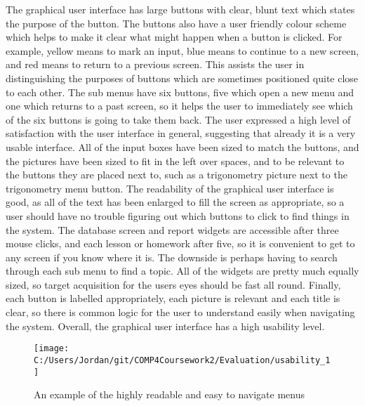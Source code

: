 The graphical user interface has large buttons with clear, blunt text which states the purpose of the button. The buttons also have a user friendly colour scheme which helps to make it clear what might happen when a button is clicked. For example, yellow means to mark an input, blue means to continue to a new screen, and red means to return to a previous screen. This assists the user in distinguishing the purposes of buttons which are sometimes positioned quite close to each other. The sub menus have six buttons, five which open a new menu and one which returns to a past screen, so it helps the user to immediately see which of the six buttons is going to take them back. The user expressed a high level of satisfaction with the user interface in general, suggesting that already it is a very usable interface. All of the input boxes have been sized to match the buttons, and the pictures have been sized to fit in the left over spaces, and to be relevant to the buttons they are placed next to, such as a trigonometry picture next to the trigonometry menu button. The readability of the graphical user interface is good, as all of the text has been enlarged to fill the screen as appropriate, so a user should have no trouble figuring out which buttons to click to find things in the system. The database screen and report widgets are accessible after three mouse clicks, and each lesson or homework after five, so it is convenient to get to any screen if you know where it is. The downside is perhaps having to search through each sub menu to find a topic. All of the widgets are pretty much equally sized, so target acquisition for the users eyes should be fast all round. Finally, each button is labelled appropriately, each picture is relevant and each title is clear, so there is common logic for the user to understand easily when navigating the system. Overall, the graphical user interface has a high usability level.

\begin{figure}[H]
	\texttt{[image: C:/Users/Jordan/git/COMP4Coursework2/Evaluation/usability\_1]}
	\caption{An example of the highly readable and easy to navigate menus}
\end{figure}

